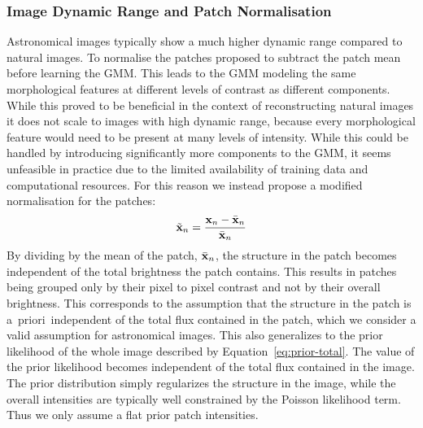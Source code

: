 \documentclass[twocolumn]{aastex631}
\newcommand{\aprioir}{a~priori~}
\begin{document}
    \subsubsection{Image Dynamic Range and Patch Normalisation}
    \label{ssec:patch-norm}
    Astronomical images typically show a much higher dynamic range compared to natural images.
    To normalise the patches \cite{Zoran2011} proposed to subtract the patch mean before learning the GMM. This leads to the GMM modeling the same morphological features at different levels of contrast as different components. While this proved to be beneficial in the context of reconstructing natural images it does not scale to images with high dynamic range, because every morphological feature would need to be present at many levels of intensity. While this could be handled by introducing significantly more components to the GMM, it seems unfeasible in practice due to the limited availability of training data and computational resources. For this reason we instead propose a modified normalisation for the patches:
    \begin{equation}
        \label{eq:patch-norm}
        \tilde{\mathbf{x}}_n = \frac{\mathbf{x}_n - \Bar{\mathbf{x}}_n}{\Bar{\mathbf{x}}_n}
    \end{equation}
    By dividing by the mean of the patch, $\Bar{\mathbf{x}}_n$, the structure in the patch becomes independent of the total brightness the patch contains. This results in patches being grouped only by their pixel to pixel contrast and not by their overall brightness. This corresponds to the assumption that the structure in the patch is \aprioir independent of the total flux contained in the patch, which we consider a valid assumption for astronomical images. This also generalizes to the prior likelihood of the whole image described by Equation~\ref{eq:prior-total}. The value of the prior likelihood becomes independent of the total flux contained in the image. The prior distribution simply regularizes the structure in the image, while the overall intensities are typically well constrained by the Poisson likelihood term. Thus we only assume a flat prior patch intensities.
    
\end{document}
